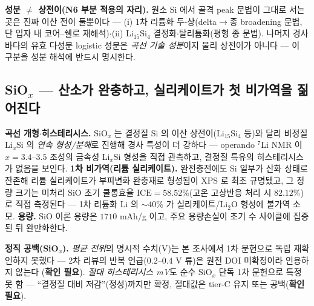 \begin{srcbox}
\textbf{성분 $\ne$ 상전이(N6 부분 적용의 자리).} 원소 Si 에서 골격 peak 문법이 그대로 서는 곳은 진짜
이산 전이 둘뿐이다 --- (i) 1차 리튬화 두-상(delta$\to$종 broadening 문법, 단 입자 내 코어--쉘로
재해석)$\cdot$(ii) Li$_{15}$Si$_4$ 결정화$\cdot$탈리튬화(평형 종 문법). 나머지 경사 바다의 유효 다성분
logistic 성분은 \emph{곡선 기술 성분}이지 물리 상전이가 아니다 --- 이 구분을 성분 해석에 반드시 명시한다.
\end{srcbox}

\subsection{SiO$_x$ --- 산소가 완충하고, 실리케이트가 첫 비가역을 짊어진다}\label{ssec:si-siox}
\textbf{곡선 개형$\cdot$히스테리시스.} SiO$_x$ 는 결정질 Si 의 이산 상전이(Li$_{15}$Si$_4$ 등)와 달리
비정질 Li$_x$Si 의 \emph{연속 형성/분해}로 진행해 경사 특성이 더 강하다 --- operando $^7$Li NMR 이
$x{=}3.4$--$3.5$ 조성의 금속성 Li$_x$Si 형성을 직접 관측하고, 결정질 특유의 히스테리시스가 없음을
보인다\cite{kitada_sio2019}. \textbf{1차 비가역(리튬 실리케이트).} 완전충전에도 Si 일부가 산화 상태로
잔존해 리튬 실리케이트가 부피변화 완충재로 형성됨이 XPS 로 최초 규명됐고\cite{miyachi_sio2005}, 그
정량 크기는 미처리 SiO 초기 쿨롱효율 $\mathrm{ICE}=58.52\%$(고온 고상반응 처리 시 $82.12\%$)로 직접
측정된다\cite{yom_sio2016} --- 1차 리튬화 Li 의 $\sim40\%$ 가 실리케이트/Li$_2$O 형성에 불가역 소모.
\textbf{용량.} SiO 이론 용량은 $1710$ mAh/g 이고, 주요 용량손실이 초기 수 사이클에 집중된 뒤
완만화한다\cite{zhang_sio2018}.

\begin{warnbox}
\textbf{정직 공백(SiO$_x$).} \emph{평균 전위}의 명시적 수치(V)는 본 조사에서 1차 문헌으로 독립
재확인하지 못했다 --- 2차 리뷰의 반복 언급($0.2$--$0.4$ V 류)은 원전 DOI 미확정이라 인용하지 않는다
(\textbf{확인 필요}). \emph{절대 히스테리시스 mV}도 순수 SiO$_x$ 단독 1차 문헌으로 특정 못 함 ---
``결정질 대비 저감''(정성)까지만 확정, 절대값은 tier-C 유지 또는 공백(\textbf{확인 필요}).
\end{warnbox}

